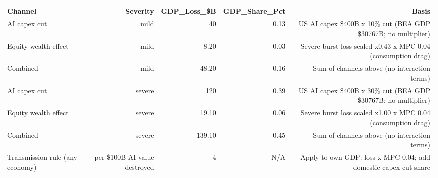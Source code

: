 

\begin{tabular}{@{}lrrrr@{}}
\toprule
Channel & Severity & GDP\_Loss\_\$B & GDP\_Share\_Pct & Basis \\
\midrule
AI capex cut & mild & 40 & 0.13 & US AI capex \$400B x 10\% cut (BEA GDP \$30767B; no multiplier) \\
Equity wealth effect & mild & 8.20 & 0.03 & Severe burst loss scaled x0.43 x MPC 0.04 (consumption drag) \\
Combined & mild & 48.20 & 0.16 & Sum of channels above (no interaction terms) \\
AI capex cut & severe & 120 & 0.39 & US AI capex \$400B x 30\% cut (BEA GDP \$30767B; no multiplier) \\
Equity wealth effect & severe & 19.10 & 0.06 & Severe burst loss scaled x1.00 x MPC 0.04 (consumption drag) \\
Combined & severe & 139.10 & 0.45 & Sum of channels above (no interaction terms) \\
Transmission rule (any economy) & per \$100B AI value destroyed & 4 & N/A & Apply to own GDP: loss x MPC 0.04; add domestic capex-cut share \\
\bottomrule
\end{tabular}